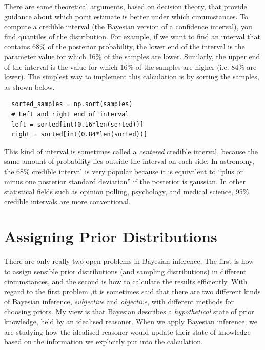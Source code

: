 There are some theoretical arguments, based on decision theory, that provide
guidance about which point estimate is better under which circumstances.
To compute a credible interval (the Bayesian version of a confidence interval),
you find quantiles of the distribution. For example, if we want to find an
interval that contains 68\% of the posterior probability, the lower end of the
interval is the parameter value for which 16\% of the samples are lower.
Similarly, the upper end of the interval is the value for which 16\% of the
samples are higher (i.e. 84\% are lower). The simplest way to implement this
calculation is by sorting the samples, as shown below.

\begin{verbatim}
  sorted_samples = np.sort(samples)
  # Left and right end of interval
  left = sorted[int(0.16*len(sorted))]
  right = sorted[int(0.84*len(sorted))]
\end{verbatim}

This kind of interval is sometimes called a {\it centered} credible interval,
because the same amount of probability lies outside the interval on each side.
In astronomy, the 68\% credible interval is very popular because it is
equivalent to ``plus or minus one posterior standard deviation'' if the
posterior is gaussian. In other statistical fields such as opinion polling,
psychology, and medical science, 95\% credible intervals are more conventional.

\section{Assigning Prior Distributions}
There are only really two open problems in
Bayesian inference. The first is how to assign sensible prior distributions
(and sampling distributions) in different circumstances, and the
second is how to calculate the results efficiently. With regard to the first
problem ,it is sometimes said that there are two different kinds of Bayesian inference,
{\it subjective} and {\it objective}, with different methods for choosing
priors. My view is that Bayesian describes a {\it hypothetical}
state of prior knowledge, held by an idealised reasoner. When we apply
Bayesian inference, we are studying how the idealised reasoner would update
their state of knowledge based on the information we explicitly put into the
calculation.

